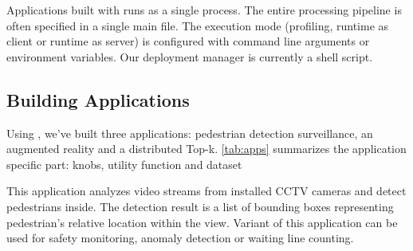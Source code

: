 


Applications built with \sysname{} runs as a single process. The entire
processing pipeline is often specified in a single main file. The execution mode
(profiling, runtime as client or runtime as server) is configured with command
line arguments or environment variables. Our deployment manager is currently a
shell script.

\subsection{Building \sysname{} Applications}
\label{sec:build-appl}

Using \sysname{}, we've built three applications: pedestrian detection
surveillance, an augmented reality and a distributed Top-k. \autoref{tab:apps}
summarizes the application specific part: knobs, utility function and dataset


 This application analyzes video streams from
installed CCTV cameras and detect pedestrians inside. The detection result is a
list of bounding boxes representing pedestrian's relative location within the
view. Variant of this application can be used for safety monitoring, anomaly
detection or waiting line counting.

